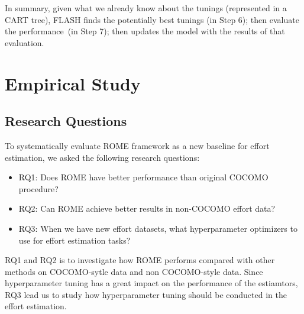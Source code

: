 \documentclass[sigconf,review,anonymous]{acmart}
\newcommand{\bi}{\begin{itemize}}
\newcommand{\ei}{\end{itemize}}
\begin{document}


In summary,  given what we already know about the tunings (represented in a CART tree),
FLASH finds the potentially best tunings (in Step 6); then evaluate the performance~(in Step 7); 
then  updates the model with the results of that evaluation.



\section{Empirical Study} \label{sect:study} 
\subsection{Research Questions}
To systematically evaluate ROME framework as a new baseline for effort estimation,  we asked the following research questions:
\bi
\item RQ1: Does ROME have better performance than original COCOMO procedure?
\item RQ2: Can ROME achieve better results in non-COCOMO effort data?
\item RQ3: When we have new effort datasets, what hyperparameter optimizers to use for effort estimation tasks?
\ei
RQ1 and RQ2 is to investigate how ROME performs compared with other methods on COCOMO-sytle data and non COCOMO-style data. Since hyperparameter tuning has a great impact on the performance of the estiamtors, RQ3 lead us to study how hyperparameter tuning should be conducted in the effort estimation. 
\end{document}
